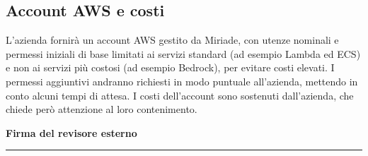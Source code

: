 \documentclass[11pt, a4paper]{article}
\begin{document}
\subsection{Account AWS e costi}
L'azienda fornirà un account AWS gestito da Miriade, con utenze nominali e permessi iniziali di base limitati ai servizi standard (ad esempio Lambda ed ECS) e non ai servizi più costosi (ad esempio Bedrock), per evitare costi elevati. I permessi aggiuntivi andranno richiesti in modo puntuale all'azienda, mettendo in conto alcuni tempi di attesa. I costi dell'account sono sostenuti dall'azienda, che chiede però attenzione al loro contenimento.


\vfill
\hfill
\begin{minipage}{0.4\textwidth}
    \centering
    \textbf{Firma del revisore esterno}\par
    \vspace{1.5cm}
    \rule{\textwidth}{0.4pt}
\end{minipage}

\vspace{2cm}
\end{document}
